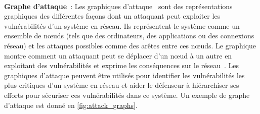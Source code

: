 
\

\noindent
\textbf{Graphe d'attaque}~: \quad Les graphiques d'attaque~\cite{CPhilips1998} sont des représentations graphiques des différentes façons dont un attaquant peut exploiter les vulnérabilités d'un système en réseau. Ils représentent le système comme un ensemble de nœuds (tels que des ordinateurs, des applications ou des connexions réseau) et les attaques possibles comme des arêtes entre ces nœuds. Le graphique montre comment un attaquant peut se déplacer d'un nœud à un autre en exploitant des vulnérabilités et exprime les conséquences sur le réseau~\cite{CPhilips1998}.
Les graphiques d'attaque peuvent être utilisés pour identifier les vulnérabilités les plus critiques d'un système en réseau et aider le défenseur à hiérarchiser ses efforts pour sécuriser ces vulnérabilités dans ce système. Un exemple de graphe d'attaque est donné en \autoref{fig:attack_graphs}.

